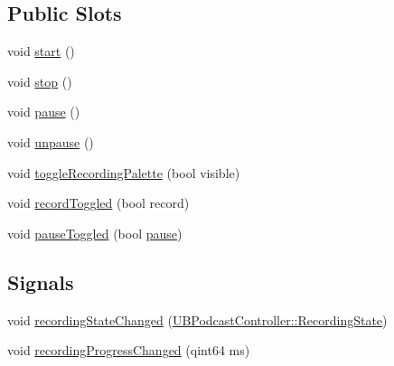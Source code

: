 \subsection*{Public Slots}
\begin{DoxyCompactItemize}
\item 
void \hyperlink{class_u_b_podcast_controller_a5a64c306dc45b1279641b03b202ed501}{start} ()
\item 
void \hyperlink{class_u_b_podcast_controller_afd99dc589c27ad55139852cc6f6dad02}{stop} ()
\item 
void \hyperlink{class_u_b_podcast_controller_a0b73b89edfa24177cb95b3337241166c}{pause} ()
\item 
void \hyperlink{class_u_b_podcast_controller_af9a1973e7ff4316ed038c8749002c1e2}{unpause} ()
\item 
void \hyperlink{class_u_b_podcast_controller_ab9f47a41e489b242fed9396277dfc5af}{toggle\-Recording\-Palette} (bool visible)
\item 
void \hyperlink{class_u_b_podcast_controller_a794bf5bf9a47e285475d96d8afa215e4}{record\-Toggled} (bool record)
\item 
void \hyperlink{class_u_b_podcast_controller_a9504ce179cf35fb113b21f7c16a1337b}{pause\-Toggled} (bool \hyperlink{class_u_b_podcast_controller_a0b73b89edfa24177cb95b3337241166c}{pause})
\end{DoxyCompactItemize}
\subsection*{Signals}
\begin{DoxyCompactItemize}
\item 
void \hyperlink{class_u_b_podcast_controller_aa5190204c51c549955b0c53a5af5bdaf}{recording\-State\-Changed} (\hyperlink{class_u_b_podcast_controller_a8d0cf82737deae51ef72eaea4797c3a8}{U\-B\-Podcast\-Controller\-::\-Recording\-State})
\item 
void \hyperlink{class_u_b_podcast_controller_a06e78fa4a1b4f4fabd9e03d738ef03cb}{recording\-Progress\-Changed} (qint64 ms)
\end{DoxyCompactItemize}
